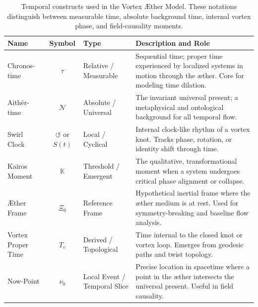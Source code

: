 \documentclass[12pt]{article}
\begin{document}
    \begin{table}[h]
        \centering
        \begin{tabular}{|l|c|l|p{7cm}|}
            \hline
            \textbf{Name} & \textbf{Symbol} & \textbf{Type} & \textbf{Description and Role} \\
            \hline
            Chronos-time & $\tau$ & Relative / Measurable & Sequential time; proper time experienced by localized systems in motion through the æther. Core for modeling time dilation. \\
            \hline
            Aithēr-time & $\mathcal{N}$ & Absolute / Universal & The invariant universal present; a metaphysical and ontological background for all temporal flow. \\
            \hline
            Swirl Clock & $\circlearrowleft$ or $S(t)$ & Local / Cyclical & Internal clock-like rhythm of a vortex knot. Tracks phase, rotation, or identity shift through time. \\
            \hline
            Kairos Moment & $\mathbb{K}$ & Threshold / Emergent & The qualitative, transformational moment when a system undergoes critical phase alignment or collapse. \\
            \hline
            Æther Frame & $\Xi_0$ & Reference Frame & Hypothetical inertial frame where the æther medium is at rest. Used for symmetry-breaking and baseline flow analysis. \\
            \hline
            Vortex Proper Time & $T_v$ & Derived / Topological & Time internal to the closed knot or vortex loop. Emerges from geodesic paths and twist topology. \\
            \hline
            Now-Point & $\nu_0$ & Local Event / Temporal Slice & Precise location in spacetime where a point in the æther intersects the universal present. Useful in field causality. \\
            \hline
        \end{tabular}
        \caption{Temporal constructs used in the Vortex Æther Model. These notations distinguish between measurable time, absolute background time, internal vortex phase, and field-causality moments.}
        \label{tab:VAM_time}
    \end{table}
\end{document}
